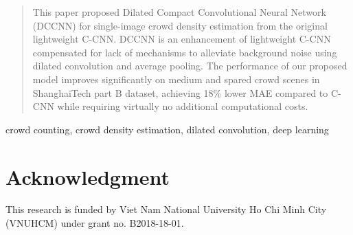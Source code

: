 \documentclass[conference]{IEEEtran}
\begin{document}
\begin{abstract}
This paper proposed Dilated Compact Convolutional Neural Network (DCCNN) for single-image crowd density estimation from the original lightweight C-CNN.  DCCNN is an enhancement of lightweight C-CNN compensated for lack of mechanisms to alleviate background noise using dilated convolution and average pooling. The performance of our proposed model improves significantly on medium and spared crowd scenes in ShanghaiTech part B dataset, achieving 18\% lower MAE compared to C-CNN while requiring virtually no additional computational costs.
\end{abstract}

\begin{IEEEkeywords}
crowd counting, crowd density estimation, dilated
convolution, deep learning
\end{IEEEkeywords}


 













\section*{Acknowledgment}

This research is funded by Viet Nam National University Ho Chi Minh City (VNUHCM) under grant no. B2018-18-01.



\end{document}
